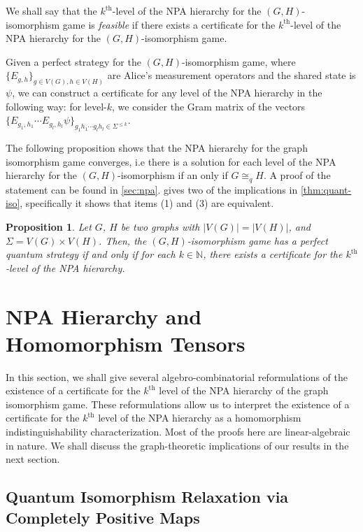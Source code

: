 \documentclass[11pt,a4paper]{article}
\theoremstyle{plain}
\newtheorem{prop}[thm]{Proposition}
\theoremstyle{remark}
\theoremstyle{definition}
\newcommand{\card}[1]{\left\lvert #1 \right\rvert}
\begin{document}
We shall say that the $k^{\text{th}}$-level of the NPA hierarchy for the $(G,H)$-isomorphism game is \emph{feasible} if there exists a certificate for the $k^{\text{th}}$-level of the NPA hierarchy for the $(G,H)$-isomorphism game.  

Given a perfect strategy for the $(G,H)$-isomorphism game, where $\{E_{g,h}\}_{g \in V(G), h \in V(H)}$ are Alice's measurement operators and the shared state is $\psi$, we can construct a certificate for any level of the NPA hierarchy in the following way: for level-$k$, we consider the Gram matrix of the vectors $\{E_{g_1,h_1}\cdots E_{g_l, h_l}\psi\}_{g_1h_1\cdots g_lh_l \in \Sigma^{\leq k}}$. 


The following proposition shows that the NPA hierarchy for the graph isomorphism game converges, i.e there is a solution for each level of the NPA hierarchy for the $(G,H)$-isomorphism if an only if $G \cong_{q} H$. A proof of the statement can be found in \cref{sec:npa}. 
 gives two of the implications in \cref{thm:quant-iso}, specifically it shows that items (1) and (3) are equivalent.

\begin{prop}\label{prop:conv-npa-graph}
    Let $G$, $H$ be two graphs with $\card{V(G)} = \card{V(H)}$, and $\Sigma = V(G)\times V(H)$. Then, the $(G,H)$-isomorphism game has a perfect quantum strategy if and only if for each $k \in \mathbb{N}$, there exists a certificate for the $k^{\text{th}}$-level of the NPA hierarchy. 
\end{prop}

\section{NPA Hierarchy and Homomorphism Tensors}\label{sec:npa-hom-tensors}

In this section, we shall give several algebro-combinatorial reformulations of the existence of a certificate for the $k^{\text{th}}$ level of the NPA hierarchy of the graph isomorphism game. These reformulations allow us to interpret the existence of a certificate for the $k^{\text{th}}$ level of the NPA hierarchy as a homomorphism indistinguishability characterization. 
Most of the proofs here are linear-algebraic in nature. 
We shall discuss the graph-theoretic implications of our results in the next section.   

\subsection{Quantum Isomorphism Relaxation via Completely Positive Maps}
\end{document}
